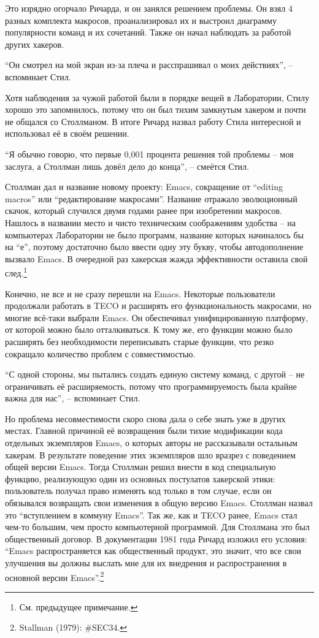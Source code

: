 Это изрядно огорчало Ричарда, и он занялся решением проблемы. Он взял 4 разных комплекта макросов, проанализировал их и выстроил диаграмму популярности команд и их сочетаний. Также он начал наблюдать за работой других хакеров.

\enquote{Он смотрел на мой экран из-за плеча и расспрашивал о моих действиях}, -- вспоминает Стил.

Хотя наблюдения за чужой работой были в порядке вещей в Лаборатории, Стилу хорошо это запомнилось, потому что он был тихим замкнутым хакером и почти не общался со Столлманом. В итоге Ричард назвал работу Стила интересной и использовал её в своём решении.

\enquote{Я обычно говорю, что первые 0,001 процента решения той проблемы -- моя заслуга, а Столлман лишь довёл дело до конца}, -- смеётся Стил.

Столлман дал и название новому проекту: Emacs, сокращение от \enquote{editing macros} или \enquote{редактирование макросами}. Название отражало эволюционный скачок, который случился двумя годами ранее при изобретении макросов. Нашлось в названии место и чисто техническим соображениям удобства -- на компьютерах Лаборатории не было программ, название которых начиналось бы на \enquote{е}, поэтому достаточно было ввести одну эту букву, чтобы автодополнение вызвало Emacs. В очередной раз хакерская жажда эффективности оставила свой след.\footnote{См. предыдущее примечание.}

Конечно, не все и не сразу перешли на Emacs. Некоторые пользователи продолжали работать в TECO и расширять его функциональность макросами, но многие всё-таки выбрали Emacs. Он обеспечивал унифицированную платформу, от которой можно было отталкиваться. К тому же, его функции можно было расширять без необходимости переписывать старые функции, что резко сокращало количество проблем с совместимостью.

\enquote{С одной стороны, мы пытались создать единую систему команд, с другой -- не ограничивать её расширяемость, потому что программируемость была крайне важна для нас}, -- вспоминает Стил.

Но проблема несовместимости скоро снова дала о себе знать уже в других местах. Главной причиной её возвращения были тихие модификации кода отдельных экземпляров Emacs, о которых авторы не рассказывали остальным хакерам. В результате поведение этих экземпляров шло вразрез с поведением общей версии Emacs. Тогда Столлман решил внести в код специальную функцию, реализующую один из основных постулатов хакерской этики: пользователь получал право изменять код только в том случае, если он обязывался возвращать свои изменения в общую версию Emacs. Столлман назвал это \enquote{вступлением в коммуну Emacs}. Так же, как и TECO ранее, Emacs стал чем-то большим, чем просто компьютерной программой. Для Столлмана это был общественный договор. В документации 1981 года Ричард изложил его условия: \enquote{Emacs распространяется как общественный продукт, это значит, что все свои улучшения вы должны выслать мне для их внедрения и распространения в основной версии Emacs}.\footnote{Stallman (1979): \#SEC34.}

